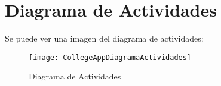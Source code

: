 %
%
%
%

\cleardoublepage
\chapter{Diagrama de Actividades}
\label{chap:activitiesdiagram}

Se puede ver una imagen del diagrama de actividades:

\begin{figure}[h]
	\centering
	\texttt{[image: CollegeAppDiagramaActividades]}
	\caption{Diagrama de Actividades}
	\label{fig:ActivitiesDiagram}
\end{figure}
